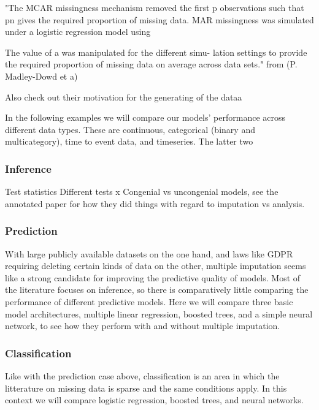 \documentclass{article}
\begin{document}
	
	"The MCAR missingness mechanism
	removed the first p observations such that pn gives the
	required proportion of missing data. MAR missingness
	was simulated under a logistic regression model using
	
	The value of a was manipulated for the different simu-
	lation settings to provide the required proportion of missing
	data on average across data sets." from (P. Madley-Dowd et a)
	
	Also check out their motivation for the generating of the dataa
	
	
	In the following examples we will compare our models' performance across different data types. These are continuous, categorical (binary and multicategory), time to event data, and timeseries. The latter two 
	
	\subsubsection{Inference}
	Test statistics
	Different tests
	x
	Congenial vs uncongenial models, see the annotated paper for how they did things with regard to imputation vs analysis. 
	
	\subsubsection{Prediction}
	With large publicly available datasets on the one hand, and laws like GDPR requiring deleting certain kinds of data on the other, multiple imputation seems like a strong candidate for improving the predictive quality of models. Most of the literature focuses on inference, so there is comparatively little comparing the performance of different predictive models. Here we will compare three basic model architectures, multiple linear regression, boosted trees, and a simple neural network, to see how they perform with and without multiple imputation.
	
	
	
	
	\subsubsection{Classification}
	Like with the prediction case above, classification is an area in which the litterature on missing data is sparse and the same conditions apply. In this context we will compare logistic regression, boosted trees, and neural networks.
	
\end{document}
